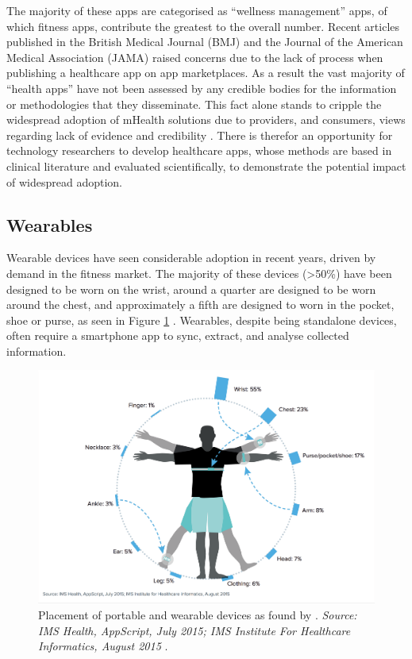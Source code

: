 The majority of these apps are categorised as ``wellness management'' apps, of which fitness apps, contribute the greatest to the overall number. Recent articles published in the British Medical Journal (BMJ) \cite{Husain2015} and the Journal of the American Medical Association (JAMA) \cite{Kuehn2015} raised concerns due to the lack of process when publishing a healthcare app on app marketplaces. As a result the vast majority of ``health apps'' have not been assessed by any credible bodies for the information or methodologies that they disseminate. This fact alone stands to cripple the widespread adoption of mHealth solutions due to providers, and consumers, views regarding lack of evidence and credibility \cite{IMSmHealth2015}. There is therefor an opportunity for technology researchers to develop healthcare apps, whose methods are based in clinical literature and evaluated scientifically, to demonstrate the potential impact of widespread adoption.

\subsection{Wearables}
Wearable devices have seen considerable adoption in recent years, driven by demand in the fitness market. The majority of these devices (\textgreater50\%) have been designed to be worn on the wrist, around a quarter are designed to be worn around the chest, and approximately a fifth are designed to worn in the pocket, shoe or purse, as seen in Figure \ref{fig: imshealth-wearableposition} \cite{IMSmHealth2015}. Wearables, despite being standalone devices, often require a smartphone app to sync, extract, and analyse collected information.

\begin{figure}[h]
    \centering
    \includegraphics[scale=0.2, angle=0]{Files/literature-review/figures/imshealth-wearableposition}
    \caption{Placement of portable and wearable devices as found by \citeauthor{IMSmHealth2015}. \textit{Source: IMS Health, AppScript, July 2015; IMS Institute For Healthcare Informatics, August 2015} \cite{IMSmHealth2015}.}
    \label{fig: imshealth-wearableposition}
\end{figure}

